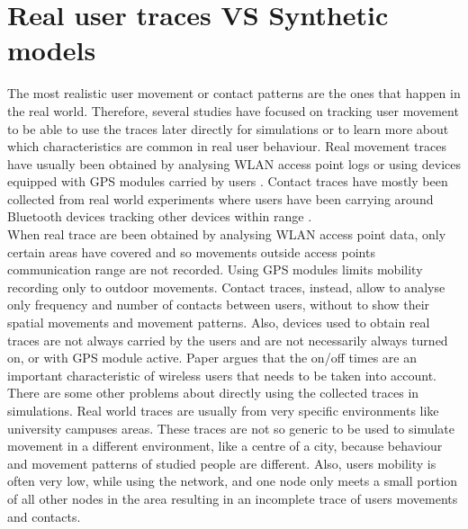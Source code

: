  


\section{Real user traces VS Synthetic models}
The most realistic user movement or contact patterns are the ones that happen in the real world. Therefore, several studies have focused on tracking user movement to be able to use the traces later directly for simulations or to learn more about which characteristics are common in real user behaviour. Real movement traces have usually been obtained by analysing WLAN access point logs \cite{Balachandran:2002:CUB:511399.511359} \cite{Ghosh:2006:PMP:1132983.1132993} \cite{Shaffer:2005:AMM:1104998.1105285} or using devices equipped with GPS modules carried by users \cite{Ashbrook:2002:LSL:862896.881068}. Contact traces have mostly been collected from real world experiments where users have been carrying around Bluetooth devices tracking other devices within range \cite{Natarajan:2007:UUI:1762888.1762904}.
\\

When real trace are been obtained by analysing WLAN access point data, only certain areas have covered and so movements outside access points communication range are not recorded. Using GPS modules limits mobility recording only to outdoor movements. Contact traces, instead, allow to analyse only frequency and number of contacts between users, without to show their spatial movements and movement patterns. Also, devices used to obtain real traces are not always carried by the users and are not necessarily always turned on, or with GPS module active. Paper \cite{ImpactofHumanMobility} argues that the on/off times are an important characteristic of wireless users that needs to be taken into account.
\\

There are some other problems about directly using the collected traces in simulations. Real world traces are usually from very specific environments like university campuses areas. These traces are not so generic to be used to simulate movement in a different environment, like a centre of a city, because behaviour and movement patterns of studied people are different. Also, users mobility is often very low, while using the network, and one node only meets a small portion of all other nodes in the area resulting in an incomplete trace of users movements and contacts.
\\


